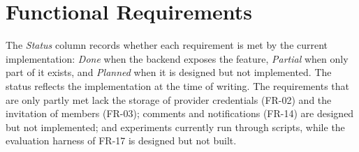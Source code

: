 \section{Functional Requirements}
\label{sec:sd-fr}

The \emph{Status} column records whether each requirement is met by the current implementation: \emph{Done} when the backend exposes the feature, \emph{Partial} when only part of it exists, and \emph{Planned} when it is designed but not implemented. The status reflects the implementation at the time of writing. The requirements that are only partly met lack the storage of provider credentials (FR-02) and the invitation of members (FR-03); comments and notifications (FR-14) are designed but not implemented; and experiments currently run through scripts, while the evaluation harness of FR-17 is designed but not built.

